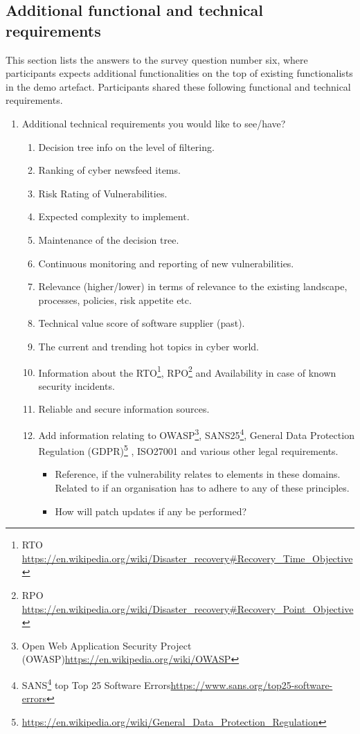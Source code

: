 \subsection{Additional functional and technical requirements}
This section lists the answers to the survey question number six, where participants expects additional functionalities on the top of existing functionalists in the demo artefact. Participants shared these following  functional and technical requirements.
\begin{enumerate}
    \item Additional technical requirements you would like to see/have?
    \begin{enumerate}
        \item Decision tree info on the level of filtering.
\item Ranking of cyber newsfeed items. 
\item  Risk Rating of Vulnerabilities.
\item  Expected complexity to implement.
\item  Maintenance of the decision tree.
\item Continuous monitoring and reporting of new vulnerabilities.
\item  Relevance (higher/lower) in terms of relevance to the existing landscape, processes, policies, risk appetite etc.
\item  Technical value score of software supplier (past).
\item  The current and trending hot topics in cyber world. 
\item  Information about the RTO\footnote{RTO \url{https://en.wikipedia.org/wiki/Disaster_recovery\#Recovery_Time_Objective}}, RPO\footnote{RPO \url{https://en.wikipedia.org/wiki/Disaster_recovery\#Recovery_Point_Objective}} and Availability in case of known security incidents.

\item Reliable and secure information sources.
\item Add  information relating to OWASP\footnote{Open Web Application Security Project (OWASP)\url{https://en.wikipedia.org/wiki/OWASP} }, SANS25\footnote{SANS\footnote{\url{https://en.wikipedia.org/wiki/SANS_Institute}} top Top 25 Software Errors\url{https://www.sans.org/top25-software-errors}}, General Data Protection Regulation (GDPR)\footnote{\url{https://en.wikipedia.org/wiki/General_Data_Protection_Regulation}} , ISO27001 and various other legal requirements.
    \begin{itemize}
        \item Reference, if the vulnerability relates to elements in these domains. Related to if an organisation has to adhere to any of these
        principles.
     \item How will patch updates if any be performed?
    \end{itemize}


\end{enumerate}
\end{enumerate}
